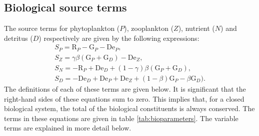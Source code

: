 \subsection{Biological source terms}
The source terms for phytoplankton ($P$), zooplankton ($Z$), nutrient ($N$)
and detritus ($D$) respectively are given by the following expressions:
\begin{gather}
  S_P=\mathrm{R}_P -  \mathrm{G}_P -\mathrm{De}_P,\\
  S_Z=\gamma\beta(\mathrm{G}_P+\mathrm{G}_D) - \mathrm{De}_Z,\\
  S_N=-\mathrm{R}_P + \mathrm{De}_D +
  (1-\gamma)\beta(\mathrm{G}_P+\mathrm{G}_D),\\
  S_D=-\mathrm{De}_D + \mathrm{De}_P + \mathrm{De}_Z + (1-\beta)\mathrm{G}_P
  -\beta\mathrm{G}_D).
\end{gather}
The definitions of each of these terms are given below. It is significant
that the right-hand sides of these equations sum to zero. This implies that,
for a closed biological system, the total of the biological constituents is
always conserved. The terms in these equations are given in table
\ref{tab:bioparameters}. The variable terms are explained in more detail below.

